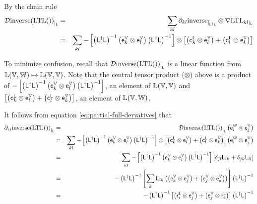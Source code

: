 By the chain rule
\begin{eqnarray}
{\mathcal{D}{\mathrm{inverse}(\mathrm{LTL}())}_{\mid_{\mathsf{L}}}}
& = &
\sum_{kl}
{\partial}_{kl}{\mathrm{inverse}}_{\mid_{\mathsf{L}^{\dagger}\mathsf{L}}}
\otimes
{\mathbf \nabla}{\mathrm{LTL}_{kl}}_{\mid_{\mathsf{L}}}
\\
& = &
\sum_{kl}
- \left[
\left( \mathsf{L}^{\dagger} \mathsf{L} \right)^{-1}
\left( \mathsf{e}_k^{\mathbb{V}} \otimes \mathsf{e}_l^{\mathbb{V}} \right)
\left( \mathsf{L}^{\dagger} \mathsf{L} \right)^{-1}
\right]
\otimes
\left[
\left( \mathsf{c}_k^{\mathsf{L}} \otimes \mathsf{e}_l^{\mathbb{V}} \right)
+
\left( \mathsf{c}_l^{\mathsf{L}} \otimes \mathsf{e}_k^{\mathbb{V}} \right)
\right]
\nonumber
\end{eqnarray}

To minimize confusion,
recall that ${\mathcal{D}{\mathrm{inverse}(\mathrm{LTL}())}_{\mid_{\mathsf{L}}}}$ is
a linear function from $\mathbb{L}(\mathbb{V},\mathbb{W}) \mapsto \mathbb{L}(\mathbb{V},\mathbb{V})$.
Note that the central tensor product ($\otimes$) above
is a product of
$
- \left[
\left( \mathsf{L}^{\dagger} \mathsf{L} \right)^{-1}
\left( \mathsf{e}_k^{\mathbb{V}} \otimes \mathsf{e}_l^{\mathbb{V}} \right)
\left( \mathsf{L}^{\dagger} \mathsf{L} \right)^{-1}
\right]
$,
an element of $\mathbb{L}(\mathbb{V},\mathbb{V})$
and
$
\left[
\left( \mathsf{c}_k^{\mathsf{L}} \otimes \mathsf{e}_l^{\mathbb{V}} \right)
+
\left( \mathsf{c}_l^{\mathsf{L}} \otimes \mathsf{e}_k^{\mathbb{V}} \right)
\right]
$,
an element of $\mathbb{L}(\mathbb{V},\mathbb{W})$.

It follows from equation \ref{eq:partial-full-dervatives} that
\begin{eqnarray}
{\partial}_{ij}{\mathrm{inverse}(\mathrm{LTL}())}_{\mid_{\mathsf{L}}}
& = &
{\mathcal{D}{\mathrm{inverse}(\mathrm{LTL}())}_{\mid_{\mathsf{L}}}}
\left( \mathsf{e}_i^{\mathbb{W}} \otimes \mathsf{e}_j^{\mathbb{V}} \right)
\\
& = &
\sum_{kl}
- \left[
\left( \mathsf{L}^{\dagger} \mathsf{L} \right)^{-1}
\left( \mathsf{e}_k^{\mathbb{V}} \otimes \mathsf{e}_l^{\mathbb{V}} \right)
\left( \mathsf{L}^{\dagger} \mathsf{L} \right)^{-1}
\right]
\otimes
\left[
\left( \mathsf{c}_k^{\mathsf{L}} \otimes \mathsf{e}_l^{\mathbb{V}} \right)
+
\left( \mathsf{c}_l^{\mathsf{L}} \otimes \mathsf{e}_k^{\mathbb{V}} \right)
\right]
\left( \mathsf{e}_i^{\mathbb{W}} \otimes \mathsf{e}_j^{\mathbb{V}} \right)
\nonumber
\\
& = &
\sum_{kl}
- \left[
\left( \mathsf{L}^{\dagger} \mathsf{L} \right)^{-1}
\left( \mathsf{e}_k^{\mathbb{V}} \otimes \mathsf{e}_l^{\mathbb{V}} \right)
\left( \mathsf{L}^{\dagger} \mathsf{L} \right)^{-1}
\right]
\left[
\delta_{jl}
\mathsf{L}_{ik}
+
\delta_{jk}
\mathsf{L}_{il}
\right]
\nonumber
\\
& = &
-
\left( \mathsf{L}^{\dagger} \mathsf{L} \right)^{-1}
\left[
\sum_{k}
\mathsf{L}_{ik}
\left(
\left( \mathsf{e}_k^{\mathbb{V}} \otimes \mathsf{e}_j^{\mathbb{V}} \right)
+
\left( \mathsf{e}_j^{\mathbb{V}} \otimes \mathsf{e}_k^{\mathbb{V}} \right)
\right)
\right]
\left( \mathsf{L}^{\dagger} \mathsf{L} \right)^{-1}
\nonumber
\\
& = &
-
\left( \mathsf{L}^{\dagger} \mathsf{L} \right)^{-1}
\left[
\left( \mathsf{r}_i^{\mathsf{L}} \otimes \mathsf{e}_j^{\mathbb{V}} \right)
+
\left( \mathsf{e}_j^{\mathbb{V}} \otimes \mathsf{r}_i^{\mathsf{L}} \right)
\right]
\left( \mathsf{L}^{\dagger} \mathsf{L} \right)^{-1}
\nonumber
\end{eqnarray}

